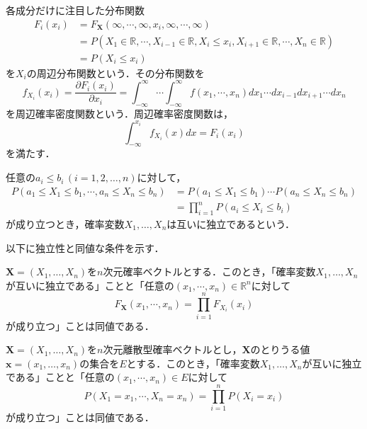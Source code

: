 \documentclass{jsreport}
\begin{document}
各成分だけに注目した分布関数
\begin{align}
  F_i(x_i) &= F_{\bm{X}}(\infty, \cdots, \infty, x_i, \infty, \cdots, \infty) \nonumber \\
   &= P(X_1 \in \mathbb{R}, \cdots, X_{i - 1} \in \mathbb{R}, X_i \leq x_i, X_{i + 1} \in \mathbb{R}, \cdots, X_n \in \mathbb{R}) \nonumber \\
   &= P(X_i \leq x_i) \nonumber
\end{align}
を$X_i$の周辺分布関数という．その分布関数を
\begin{equation}
  f_{X_i}(x_i) = \frac{\partial F_i(x_i)}{\partial x_i} = \int_{-\infty}^{\infty} \cdots \int_{-\infty}^{\infty} f(x_1, \cdots, x_n) dx_1 \cdots dx_{i - 1} dx_{i + 1} \cdots dx_n \nonumber
\end{equation}
を周辺確率密度関数という．周辺確率密度関数は，
\begin{equation}
  \int_{-\infty}^{x_i} f_{X_i}(x) dx = F_i(x_i) \nonumber
\end{equation}
を満たす．

\begin{screen}
  \begin{defi}[確率変数の独立]
    任意の$a_i \leq b_i \, (i = 1, 2, \ldots, n)$に対して，
    \begin{align}
      P(a_1 \leq X_1 \leq b_1, \cdots, a_n \leq X_n \leq b_n) &= P(a_1 \leq X_1 \leq b_1) \cdots P(a_n \leq X_n \leq b_n) \nonumber \\
      &= \prod_{i = 1}^n P(a_i \leq X_i \leq b_i) \nonumber
    \end{align}
    が成り立つとき，確率変数$X_1, \ldots, X_n$は互いに独立であるという．
  \end{defi}
\end{screen}

以下に独立性と同値な条件を示す．

$\bm{X} = (X_1, \ldots, X_n)$を$n$次元確率ベクトルとする．このとき，「確率変数$X_1, \ldots, X_n$が互いに独立である」ことと「任意の$(x_1, \cdots, x_n) \in \mathbb{R}^n$に対して
\begin{equation}
  F_{\bm{X}}(x_1, \cdots, x_n) = \prod_{i = 1}^n F_{X_i}(x_i) \nonumber
\end{equation}
が成り立つ」ことは同値である．

$\bm{X} = (X_1, \ldots, X_n)$を$n$次元離散型確率ベクトルとし，$\bm{X}$のとりうる値$\bm{x} = (x_1, \ldots, x_n)$の集合を$E$とする．このとき，「確率変数$X_1, \ldots, X_n$が互いに独立である」ことと「任意の$(x_1, \cdots, x_n) \in E$に対して
\begin{equation}
  P(X_1 = x_1, \cdots, X_n = x_n) = \prod_{i = 1}^n P(X_i = x_i) \nonumber
\end{equation}
が成り立つ」ことは同値である．
\end{document}
